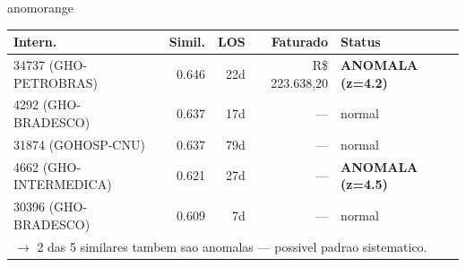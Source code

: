 \documentclass[a4paper,10pt]{article}
\begin{document}
\begin{anomalycard}[Internacao 163561 | GHO-PETROBRAS | ALTO (z=4.06)]{anomorange}
\begin{tabular}{l r r r l}\toprule\textbf{Intern.} & \textbf{Simil.} & \textbf{LOS} & \textbf{Faturado} & \textbf{Status} \\\midrule
34737 (GHO-PETROBRAS) & 0.646 & 22d & R\$ 223.638,20 & \textcolor{anomred}{\textbf{ANOMALA (z=4.2)}} \\
4292 (GHO-BRADESCO) & 0.637 & 17d & --- & \textcolor{jcubeblue}{normal} \\
31874 (GOHOSP-CNU) & 0.637 & 79d & --- & \textcolor{jcubeblue}{normal} \\
4662 (GHO-INTERMEDICA) & 0.621 & 27d & --- & \textcolor{anomred}{\textbf{ANOMALA (z=4.5)}} \\
30396 (GHO-BRADESCO) & 0.609 & 7d & --- & \textcolor{jcubeblue}{normal} \\
\multicolumn{5}{l}{\textcolor{anomred}{\small $\rightarrow$ 2 das 5 similares tambem sao anomalas --- possivel padrao sistematico.}} \\
\bottomrule\end{tabular}


\end{anomalycard}

\newpage
\end{document}
